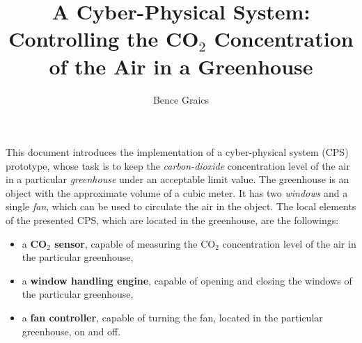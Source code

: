 \documentclass[a4paper, 11pt]{article}
\begin{document}
	
	\newcommand{\specialcell}[2][c]{%
		\begin{tabular}[#1]{@{}c@{}}#2\end{tabular}}
	
	\newenvironment*{mytable}[3]{
		\begin{table}[htbp]	
			\caption{#1}          
			\label{tab:#2}            
			\center%
			\begin{tabular}{#3}
			}
			{
			\end{tabular}
		\end{table}
	}
	
	\pagestyle{plain}
	
	
	
	\nonfrenchspacing
	\setlength{\parindent}{0em}
	\setlength{\parskip}{0.45em}
	
	\title{A Cyber-Physical System:\\Controlling the CO$_2$ Concentration of the Air in a Greenhouse}
	\date{}
	\author{Bence Graics}	
	
	\maketitle
	\tableofcontents
	\newpage
	
	This document introduces the implementation of a cyber-physical system (CPS) prototype, whose task is to keep the \emph{carbon-dioxide} concentration level of the air in a particular \emph{greenhouse} under an acceptable limit value.
	The greenhouse is an object with the approximate volume of a cubic meter. It has two \emph{windows} and a single \emph{fan}, which can be used to circulate the air in the object. The local elements of the presented CPS, which are located in the greenhouse, are the followings:
	\begin{itemize}
		\item a \textbf{CO$_2$ sensor}, capable of measuring the CO$_2$ concentration level of the air in the particular greenhouse,
		\item a \textbf{window handling engine}, capable of opening and closing the windows of the particular greenhouse,
		\item a \textbf{fan controller}, capable of turning the fan, located in the particular greenhouse, on and off.
	\end{itemize}
	
\end{document}

